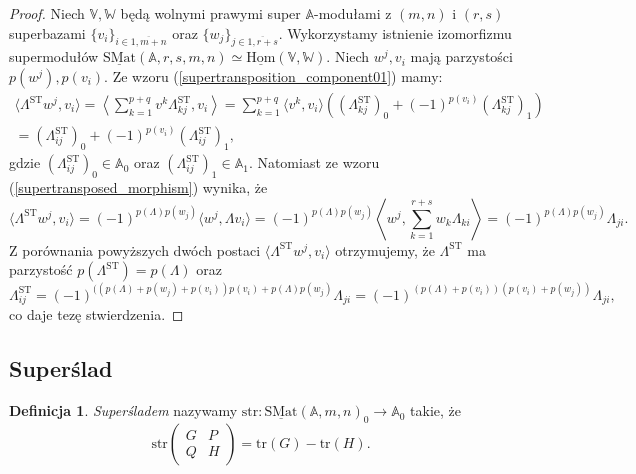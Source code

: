 \documentclass[11pt,a4paper]{report}
\theoremstyle{definition}
\newtheorem{definition}[theorem]{Definicja}
\newcommand{\tr}{\mathrm{tr}}
\newcommand{\str}{\mathrm{str}}
\begin{document}
\begin{proof}
	Niech $\mathbb{V},\mathbb{W}$ będą wolnymi prawymi super $\mathbb{A}$-modułami z $(m,n)$ i $(r,s)$ superbazami $\{ v_i \}_{i \in \overline{1,m+n}}$ oraz $\{ w_j \}_{j\in \overline{1,r+s}}$. Wykorzystamy istnienie izomorfizmu supermodułów $\underline{\mathrm{SMat}}(\mathbb{A},r,s,m,n) \simeq \underline{\mathrm{Hom}}(\mathbb{V}, \mathbb{W})$. Niech $w^j, v_i$ mają parzystości $p(w^j), p(v_i)$. Ze wzoru (\ref{supertransposition_component01}) mamy:
	\begin{equation*}
		\begin{gathered}
			\langle \Lambda^{\mathrm{ST}} w^j, v_i \rangle = \left\langle \sum_{k=1}^{p+q} v^k \Lambda^{\mathrm{ST}}_{kj}, v_i \right\rangle = \sum_{k=1}^{p+q} \langle v^k, v_i \rangle \left( \left( \Lambda^{\mathrm{ST}}_{kj} \right)_0 + (-1)^{p(v_i)}\left( \Lambda^{\mathrm{ST}}_{kj} \right)_1 \right) 
			\\ = \left( \Lambda^{\mathrm{ST}}_{ij} \right)_0 + (-1)^{p(v_i)} \left( \Lambda^{\mathrm{ST}}_{ij} \right)_1\!,
		\end{gathered}
	\end{equation*}
	gdzie $\left( \Lambda^{\mathrm{ST}}_{ij} \right)_0 \in \mathbb{A}_0$ oraz $\left( \Lambda^{\mathrm{ST}}_{ij} \right)_1 \in \mathbb{A}_1$. Natomiast ze wzoru (\ref{supertransposed_morphism}) wynika, że
	\begin{equation*}
		\langle \Lambda^{\mathrm{ST}} w^j, v_i\rangle = (-1)^{p(\Lambda)p(w_j)} \langle w^j, \Lambda v_i \rangle = (-1)^{p(\Lambda)p(w_j)} \left\langle w^j, \sum_{k=1}^{r+s} w_k \Lambda_{ki} \right\rangle = (-1)^{p(\Lambda)p(w_j)} \Lambda_{ji}.
	\end{equation*}
	Z porównania powyższych dwóch postaci $\langle \Lambda^{\mathrm{ST}} w^j, v_i \rangle$ otrzymujemy, że $\Lambda^{\mathrm{ST}}$ ma parzystość $p(\Lambda^{\mathrm{ST}}) = p(\Lambda)$ oraz
	\begin{equation*}
		\Lambda^{\mathrm{ST}}_{ij} = (-1)^{((p(\Lambda) + p(w_j) + p(v_i))p(v_i) + p(\Lambda)p(w_j)} \Lambda_{ji} = (-1)^{(p(\Lambda)+p(v_i))(p(v_i)+p(w_j))} \Lambda_{ji},
	\end{equation*}
	co daje tezę stwierdzenia.
\end{proof}

\subsection{Superślad}

\begin{definition}
	\textit{Superśladem} nazywamy $\str: \underline{\mathrm{SMat}}(\mathbb{A},m,n)_0 \rightarrow \mathbb{A}_0$ takie, że $$\str \left( \begin{matrix}
	G & P \\
	Q & H
	\end{matrix} \right) = \tr(G) - \tr(H).$$
\end{definition}
\end{document}
